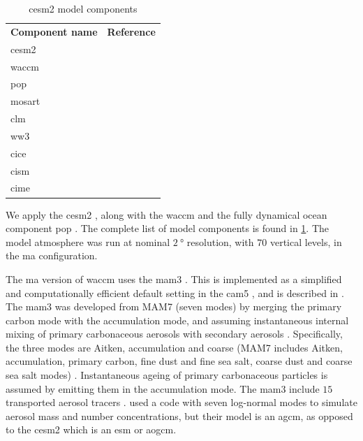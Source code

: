 \documentclass{ametsocV5}
\begin{document}
\begin{table}
  \caption{\acl*{cesm2} model components}%
  \label{tab:cesm-components}
  \begin{center}
    \begin{tabular}[c]{ll}
      \multicolumn{1}{c}{\textbf{Component name}} &
      \multicolumn{1}{c}{\textbf{Reference}}                                              \\
      \acl*{cesm2}                                & \citet{danabasoglu2020}               \\
      \acl*{waccm}                                & \citet{gettleman2019}                 \\
      \acl*{pop}                                  & \citet{smith2010, danabasoglu2020}    \\
      \acl*{mosart}                               & \citet{li2013, danabasoglu2020}       \\
      \acl*{clm}                                  & \citet{lawrence2019, danabasoglu2020} \\
      \acl*{ww3}                                  & \citet{danabasoglu2020}               \\
      \acl*{cice}                                 & \citet{danabasoglu2020}               \\
      \acl*{cism}                                 & \citet{danabasoglu2020}               \\
      \acl*{cime}                                 & \citet{danabasoglu2020}
    \end{tabular}
  \end{center}
\end{table}

We apply the \ac{cesm2} \citep{danabasoglu2020}, along with the \ac{waccm}
\citep{gettleman2019} and the fully dynamical ocean component \ac{pop} \citep{smith2010,
  danabasoglu2020}. The complete list of model components is found in
\cref{tab:cesm-components}. The model atmosphere was run at nominal \(\SI{2}{\degree}\)
resolution, with \(70\) vertical levels, in the \ac{ma} configuration.

The \ac{ma} version of \ac{waccm} uses the \ac{mam3} \citep{gettleman2019}. This is
implemented as a simplified and computationally efficient default setting in the
\ac{cam5} \citep{liu2016}, and is described in \citet{liu2012}. The \ac{mam3} was
developed from MAM7 (seven modes) by merging the primary carbon mode with the
accumulation mode, and assuming instantaneous internal mixing of primary carbonaceous
aerosols with secondary aerosols \citep{liu2016}. Specifically, the three modes are
Aitken, accumulation and coarse (MAM7 includes Aitken, accumulation, primary carbon,
fine dust and fine sea salt, coarse dust and coarse sea salt modes) \citep{liu2016}.
Instantaneous ageing of primary carbonaceous particles is assumed by emitting them in
the accumulation mode. The \ac{mam3} include \(15\) transported aerosol tracers
\citep{liu2016}. \citet{marshall2019, marshall2020, marshall2021} used a code with seven
log-normal modes to simulate aerosol mass and number concentrations, but their model is
an \ac{agcm}, as opposed to the \ac{cesm2} which is an \ac{esm} or \ac{aogcm}.
\end{document}
